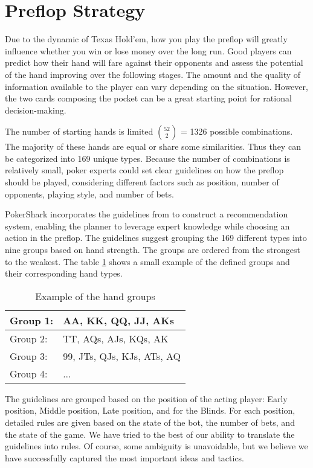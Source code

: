 \section{Preflop Strategy}

Due to the dynamic of Texas Hold'em, how you play the preflop will greatly influence whether you win or lose money over the long run.
Good players can predict how their hand will fare against their opponents and assess the potential of the hand improving over the following stages. The amount and the quality of information available to the player can vary depending on the situation. However, the two cards composing the pocket can be a great starting point for rational decision-making.

The number of starting hands is limited ${52 \choose 2}$ = 1326 possible combinations. The majority of these hands are equal or share some similarities. Thus they can be categorized into 169 unique types. Because the number of combinations is relatively small, poker experts could set clear guidelines on how the preflop should be played, considering different factors such as position, number of opponents, playing style, and number of bets.

PokerShark incorporates the guidelines from \cite{sklansky_2003} to construct a recommendation system, enabling the planner to leverage expert knowledge while choosing an action in the preflop.  The guidelines suggest grouping the 169 different types into nine groups based on hand strength. The groups are ordered from the strongest to the weakest. The table \ref{tab:handGroups} shows a small example of the defined groups and their corresponding hand types.

\begin{table}[h]
    \centering
    \begin{tabular}{|l|l|}
        \hline
        Group 1: & AA, KK, QQ, JJ, AKs        \\ \hline
        Group 2: & TT, AQs, AJs, KQs, AK      \\ \hline
        Group 3: & 99, JTs, QJs, KJs, ATs, AQ \\ \hline
        Group 4: & ...                        \\ \hline
    \end{tabular}
    \caption{Example of the hand groups}
    \label{tab:handGroups}
\end{table}

The guidelines are grouped based on the position of the acting player: Early position, Middle position, Late position, and for the Blinds.
For each position, detailed rules are given based on the state of the bot, the number of bets, and the state of the game. We have tried to the best of our ability to translate the guidelines into rules. Of course, some ambiguity is unavoidable, but we believe we have successfully captured the most important ideas and tactics.

